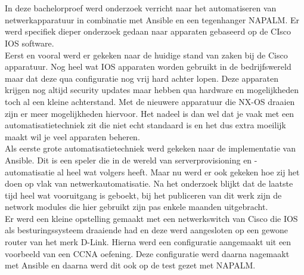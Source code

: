 


\chapter*{}

In deze bachelorproef werd onderzoek verricht naar het automatiseren van netwerkapparatuur in combinatie met Ansible en een tegenhanger NAPALM. Er werd specifiek dieper onderzoek gedaan naar apparaten gebaseerd op de CIsco IOS software. 
\\

Eerst en vooral werd er gekeken naar de huidige stand van zaken bij de Cisco apparatuur. Nog heel wat IOS apparaten worden gebruikt in de bedrijfswereld maar dat deze qua configuratie nog vrij hard achter lopen. Deze apparaten krijgen nog altijd security updates maar hebben qua hardware en mogelijkheden toch al een kleine achterstand. Met de nieuwere apparatuur die NX-OS draaien zijn er meer mogelijkheden hiervoor. Het nadeel is dan wel dat je vaak met een automatisatietechniek zit die niet echt standaard is en het dus extra moeilijk maakt wil je veel apparaten beheren.
\\

Als eerste grote automatisatietechniek werd gekeken naar de implementatie van Ansible. Dit is een speler die in de wereld van serverprovisioning en -automatisatie al heel wat volgers heeft. Maar nu werd er ook gekeken hoe zij het doen op vlak van netwerkautomatisatie. Na het onderzoek blijkt dat de laatste tijd heel wat vooruitgang is geboekt, bij het publiceren van dit werk zijn de network modules die hier gebruikt zijn pas enkele maanden uitgebracht. 
\\
Er werd een kleine opstelling gemaakt met een netwerkswitch van Cisco die IOS als besturingssysteem draaiende had en deze werd aangesloten op een gewone router van het merk D-Link. Hierna werd een configuratie aangemaakt uit een voorbeeld van een CCNA oefening. Deze configuratie werd daarna nagemaakt met Ansible en daarna werd dit ook op de test gezet met NAPALM.
\\

